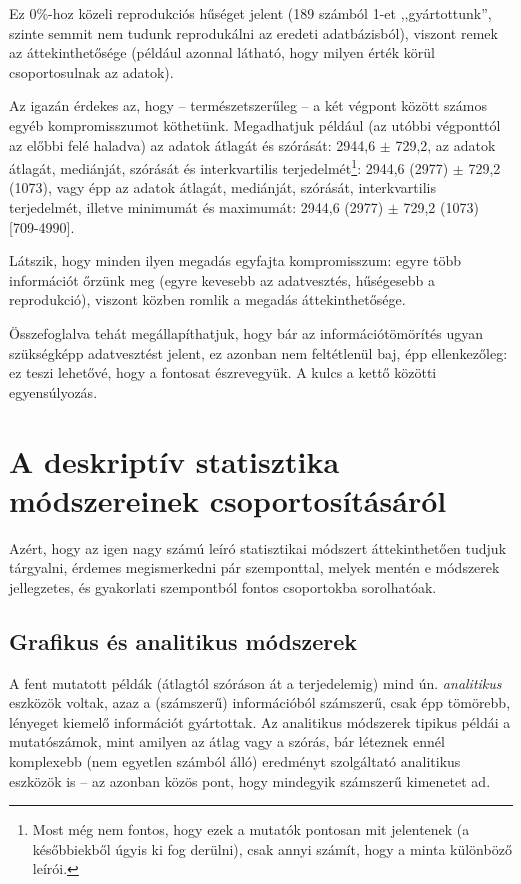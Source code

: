 \documentclass[]{book}
\let\rmarkdownfootnote\footnote%
\def\footnote{\protect\rmarkdownfootnote}
\begin{document}
Ez 0\%-hoz közeli reprodukciós hűséget jelent (189 számból 1-et
,,gyártottunk'', szinte semmit nem tudunk reprodukálni az eredeti
adatbázisból), viszont remek az áttekinthetősége (például azonnal
látható, hogy milyen érték körül csoportosulnak az adatok).

Az igazán érdekes az, hogy -- természetszerűleg -- a két végpont között
számos egyéb kompromisszumot köthetünk. Megadhatjuk például (az utóbbi
végponttól az előbbi felé haladva) az adatok átlagát és szórását: 2944,6
\(\pm\) 729,2, az adatok átlagát, mediánját, szórását és interkvartilis
terjedelmét\footnote{Most még nem fontos, hogy ezek a mutatók pontosan mit jelentenek (a későbbiekből úgyis ki fog derülni), csak annyi számít, hogy a minta különböző leírói.}:
2944,6 (2977) \(\pm\) 729,2 (1073), vagy épp az adatok átlagát,
mediánját, szórását, interkvartilis terjedelmét, illetve minimumát és
maximumát: 2944,6 (2977) \(\pm\) 729,2 (1073) {[}709-4990{]}.

Látszik, hogy minden ilyen megadás egyfajta kompromisszum: egyre több
információt őrzünk meg (egyre kevesebb az adatvesztés, hűségesebb a
reprodukció), viszont közben romlik a megadás áttekinthetősége.

Összefoglalva tehát megállapíthatjuk, hogy bár az információtömörítés
ugyan szükségképp adatvesztést jelent, ez azonban nem feltétlenül baj,
épp ellenkezőleg: ez teszi lehetővé, hogy a fontosat észrevegyük. A
kulcs a kettő közötti egyensúlyozás.

\section{A deskriptív statisztika módszereinek
csoportosításáról}\label{deskriptivcsoportositas}

Azért, hogy az igen nagy számú leíró statisztikai módszert
áttekinthetően tudjuk tárgyalni, érdemes megismerkedni pár szemponttal,
melyek mentén e módszerek jellegzetes, és gyakorlati szempontból fontos
csoportokba sorolhatóak.

\subsection{Grafikus és analitikus
módszerek}\label{deskriptivcsoportositasgrafanal}

A fent mutatott példák (átlagtól szóráson át a terjedelemig) mind ún.
\emph{analitikus} eszközök voltak, azaz a (számszerű) információból
számszerű, csak épp tömörebb, lényeget kiemelő információt gyártottak.
Az analitikus módszerek tipikus példái a mutatószámok, mint amilyen az
átlag vagy a szórás, bár léteznek ennél komplexebb (nem egyetlen számból
álló) eredményt szolgáltató analitikus eszközök is -- az azonban közös
pont, hogy mindegyik számszerű kimenetet ad.
\end{document}
